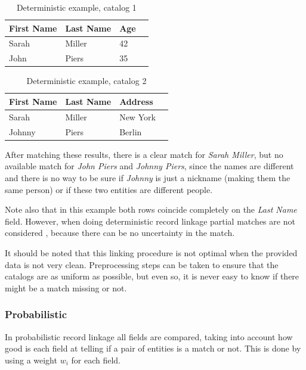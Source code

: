 \documentclass[epsfig,a4paper,11pt,titlepage,twoside,openany]{book}
\begin{document}
\begin{table}[H]
  \centering{}
  \begin{tabular}{|l|l|l|l|}
    First Name & Last Name & Age \\ \hline
    Sarah & Miller & 42 \\
    John  & Piers  & 35  \\ 
  \end{tabular}
  \caption{Deterministic example, catalog 1}
  \label{tab:ex-deterministic-1}
\end{table}


\begin{table}[H]
  \centering{}
  \begin{tabular}{|l|l|l|l|}
    First Name & Last Name & Address \\ \hline
    Sarah  & Miller & New York \\
    Johnny & Piers  & Berlin  \\ 
  \end{tabular}
  \caption{Deterministic example, catalog 2}
  \label{tab:ex-deterministic-2}
\end{table}

After matching these results, there is a clear match for \textit{Sarah Miller}, but no available match for \textit{John Piers} and \textit{Johnny Piers}, since the
names are different and there is no way to be sure if \textit{Johnny} is just a nickname (making them the same person)
or if these two entities are different people.

Note also that in this example both rows coincide completely on the \textit{Last Name} field. However, when doing deterministic record linkage partial matches are not considered \cite{dusetzina_m_2014}, because there can be no uncertainty in the match.

It should be noted that this linking procedure is not optimal when the provided data is not very clean. Preprocessing steps can be taken to ensure that the catalogs are as
uniform as possible, but even so, it is never easy to know if there might be a match missing or not.


\subsubsection{Probabilistic}
\label{sec:rl-approach-probabilistic}


In probabilistic record linkage \cite{fellegi69_theor_recor_linkag,Newcombe:1962_proba_rl,Sayers2015} all fields are compared, taking into account how good is each field at telling if a pair of entities is a match or not. This is done by using a weight $w_i$ for each field. 
\end{document}
